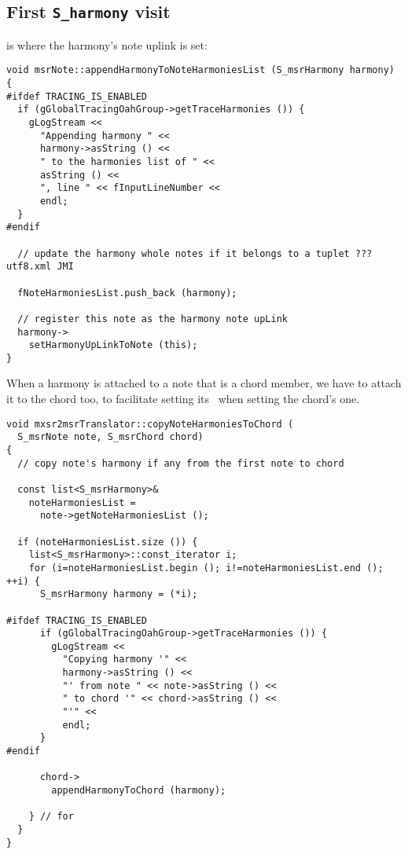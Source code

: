 \subsection{First {\tt S_harmony} visit}

 is where the harmony's note uplink is set:
\begin{lstlisting}[language=CPlusPlus]
void msrNote::appendHarmonyToNoteHarmoniesList (S_msrHarmony harmony)
{
#ifdef TRACING_IS_ENABLED
  if (gGlobalTracingOahGroup->getTraceHarmonies ()) {
    gLogStream <<
      "Appending harmony " <<
      harmony->asString () <<
      " to the harmonies list of " <<
      asString () <<
      ", line " << fInputLineNumber <<
      endl;
  }
#endif

  // update the harmony whole notes if it belongs to a tuplet ??? utf8.xml JMI

  fNoteHarmoniesList.push_back (harmony);

  // register this note as the harmony note upLink
  harmony->
    setHarmonyUpLinkToNote (this);
}
\end{lstlisting}

When a harmony is attached to a note that is a chord member, we have to attach it to the chord too, to facilitate setting its \pim\ when setting the chord's one.
\begin{lstlisting}[language=CPlusPlus]
void mxsr2msrTranslator::copyNoteHarmoniesToChord (
  S_msrNote note, S_msrChord chord)
{
  // copy note's harmony if any from the first note to chord

  const list<S_msrHarmony>&
    noteHarmoniesList =
      note->getNoteHarmoniesList ();

  if (noteHarmoniesList.size ()) {
    list<S_msrHarmony>::const_iterator i;
    for (i=noteHarmoniesList.begin (); i!=noteHarmoniesList.end (); ++i) {
      S_msrHarmony harmony = (*i);

#ifdef TRACING_IS_ENABLED
      if (gGlobalTracingOahGroup->getTraceHarmonies ()) {
        gLogStream <<
          "Copying harmony '" <<
          harmony->asString () <<
          "' from note " << note->asString () <<
          " to chord '" << chord->asString () <<
          "'" <<
          endl;
      }
#endif

      chord->
        appendHarmonyToChord (harmony);

    } // for
  }
}
\end{lstlisting}


